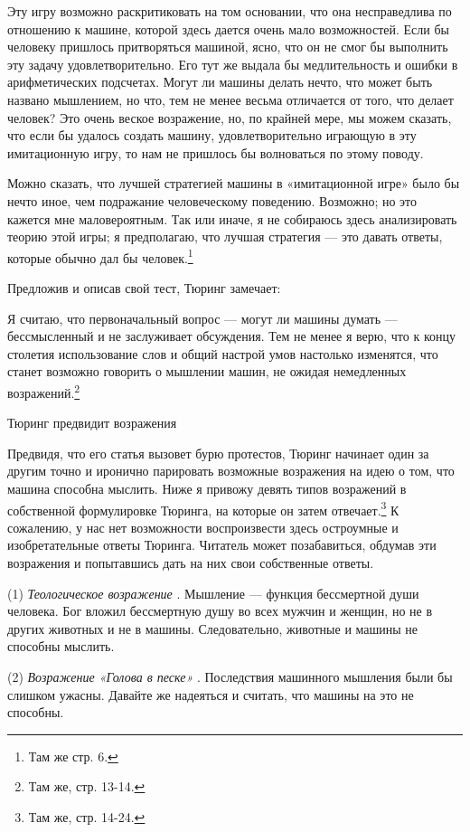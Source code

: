 Эту игру возможно раскритиковать на том основании, что она несправедлива по отношению к машине, которой здесь дается очень мало возможностей. Если бы человеку пришлось притворяться машиной, ясно, что он не смог бы выполнить эту задачу удовлетворительно. Его тут же выдала бы медлительность и ошибки в арифметических подсчетах. Могут ли машины делать нечто, что может быть названо мышлением, но что, тем не менее весьма отличается от того, что делает человек? Это очень веское возражение, но, по крайней мере, мы можем сказать, что если бы удалось создать машину, удовлетворительно играющую в эту имитационную игру, то нам не пришлось бы волноваться по этому поводу.

Можно сказать, что лучшей стратегией машины в «имитационной игре» было бы нечто иное, чем подражание человеческому поведению. Возможно; но это кажется мне маловероятным. Так или иначе, я не собираюсь здесь анализировать теорию этой игры; я предполагаю, что лучшая стратегия --- это давать ответы, которые обычно дал бы человек.\footnote{Там же стр. 6.}

Предложив и описав свой тест, Тюринг замечает:

Я считаю, что первоначальный вопрос --- могут ли машины думать --- бессмысленный и не заслуживает обсуждения. Тем не менее я верю, что к концу столетия использование слов и общий настрой умов настолько изменятся, что станет возможно говорить о мышлении машин, не ожидая немедленных возражений.\footnote{Там же, стр. 13-14.}

Тюринг предвидит возражения

Предвидя, что его статья вызовет бурю протестов, Тюринг начинает один за другим точно и иронично парировать возможные возражения на идею о том, что машина способна мыслить. Ниже я привожу девять типов возражений в собственной формулировке Тюринга, на которые он затем отвечает.\footnote{Там же, стр. 14-24.} К сожалению, у нас нет возможности воспроизвести здесь остроумные и изобретательные ответы Тюринга. Читатель может позабавиться, обдумав эти возражения и попытавшись дать на них свои собственные ответы.

(1) \emph{Теологическое возражение} . Мышление --- функция бессмертной души человека. Бог вложил бессмертную душу во всех мужчин и женщин, но не в других животных и не в машины. Следовательно, животные и машины не способны мыслить.

(2) \emph{Возражение «Голова в песке»} . Последствия машинного мышления были бы слишком ужасны. Давайте же надеяться и считать, что машины на это не способны.

